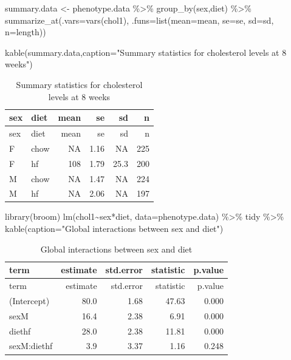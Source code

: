 \documentclass[
]{article}
\newenvironment{Shaded}{\begin{snugshade}}{\end{snugshade}}
\newcommand{\AttributeTok}[1]{\textcolor[rgb]{0.77,0.63,0.00}{#1}}
\newcommand{\FunctionTok}[1]{\textcolor[rgb]{0.00,0.00,0.00}{#1}}
\newcommand{\NormalTok}[1]{#1}
\newcommand{\OtherTok}[1]{\textcolor[rgb]{0.56,0.35,0.01}{#1}}
\newcommand{\SpecialCharTok}[1]{\textcolor[rgb]{0.00,0.00,0.00}{#1}}
\newcommand{\StringTok}[1]{\textcolor[rgb]{0.31,0.60,0.02}{#1}}
\begin{document}
\begin{Shaded}
\begin{Highlighting}[]
\NormalTok{summary.data }\OtherTok{\textless{}{-}}
\NormalTok{  phenotype.data }\SpecialCharTok{\%\textgreater{}\%}
  \FunctionTok{group\_by}\NormalTok{(sex,diet) }\SpecialCharTok{\%\textgreater{}\%}
  \FunctionTok{summarize\_at}\NormalTok{(}\AttributeTok{.vars=}\FunctionTok{vars}\NormalTok{(chol1), }\AttributeTok{.funs=}\FunctionTok{list}\NormalTok{(}\AttributeTok{mean=}\NormalTok{mean,}
                                             \AttributeTok{se=}\NormalTok{se,}
                                             \AttributeTok{sd=}\NormalTok{sd,}
                                             \AttributeTok{n=}\NormalTok{length))}

\FunctionTok{kable}\NormalTok{(summary.data,}\AttributeTok{caption=}\StringTok{"Summary statistics for cholesterol levels at 8 weeks"}\NormalTok{)}
\end{Highlighting}
\end{Shaded}

\begin{longtable}[]{@{}llrrrr@{}}
\caption{Summary statistics for cholesterol levels at 8
weeks}\tabularnewline
\toprule()
sex & diet & mean & se & sd & n \\
\midrule()
\endfirsthead
\toprule()
sex & diet & mean & se & sd & n \\
\midrule()
\endhead
F & chow & NA & 1.16 & NA & 225 \\
F & hf & 108 & 1.79 & 25.3 & 200 \\
M & chow & NA & 1.47 & NA & 224 \\
M & hf & NA & 2.06 & NA & 197 \\
\bottomrule()
\end{longtable}

\begin{Shaded}
\begin{Highlighting}[]
\FunctionTok{library}\NormalTok{(broom)}
\FunctionTok{lm}\NormalTok{(chol1}\SpecialCharTok{\textasciitilde{}}\NormalTok{sex}\SpecialCharTok{*}\NormalTok{diet, }\AttributeTok{data=}\NormalTok{phenotype.data) }\SpecialCharTok{\%\textgreater{}\%}
\NormalTok{  tidy }\SpecialCharTok{\%\textgreater{}\%}
  \FunctionTok{kable}\NormalTok{(}\AttributeTok{caption=}\StringTok{"Global interactions between sex and diet"}\NormalTok{)}
\end{Highlighting}
\end{Shaded}

\begin{longtable}[]{@{}lrrrr@{}}
\caption{Global interactions between sex and diet}\tabularnewline
\toprule()
term & estimate & std.error & statistic & p.value \\
\midrule()
\endfirsthead
\toprule()
term & estimate & std.error & statistic & p.value \\
\midrule()
\endhead
(Intercept) & 80.0 & 1.68 & 47.63 & 0.000 \\
sexM & 16.4 & 2.38 & 6.91 & 0.000 \\
diethf & 28.0 & 2.38 & 11.81 & 0.000 \\
sexM:diethf & 3.9 & 3.37 & 1.16 & 0.248 \\
\bottomrule()
\end{longtable}
\end{document}
